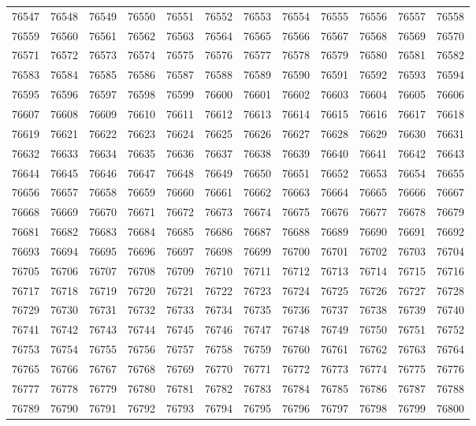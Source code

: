 \begin{center}
\begin{longtable}{llllllllllll}
76547 &76548 &76549 &76550 &76551 &76552 &76553 &76554 &76555 &76556 &76557 &76558 \\
76559 &76560 &76561 &76562 &76563 &76564 &76565 &76566 &76567 &76568 &76569 &76570 \\
76571 &76572 &76573 &76574 &76575 &76576 &76577 &76578 &76579 &76580 &76581 &76582 \\
76583 &76584 &76585 &76586 &76587 &76588 &76589 &76590 &76591 &76592 &76593 &76594 \\
76595 &76596 &76597 &76598 &76599 &76600 &76601 &76602 &76603 &76604 &76605 &76606 \\
76607 &76608 &76609 &76610 &76611 &76612 &76613 &76614 &76615 &76616 &76617 &76618 \\
76619 &76621 &76622 &76623 &76624 &76625 &76626 &76627 &76628 &76629 &76630 &76631 \\
76632 &76633 &76634 &76635 &76636 &76637 &76638 &76639 &76640 &76641 &76642 &76643 \\
76644 &76645 &76646 &76647 &76648 &76649 &76650 &76651 &76652 &76653 &76654 &76655 \\
76656 &76657 &76658 &76659 &76660 &76661 &76662 &76663 &76664 &76665 &76666 &76667 \\
76668 &76669 &76670 &76671 &76672 &76673 &76674 &76675 &76676 &76677 &76678 &76679 \\
76681 &76682 &76683 &76684 &76685 &76686 &76687 &76688 &76689 &76690 &76691 &76692 \\
76693 &76694 &76695 &76696 &76697 &76698 &76699 &76700 &76701 &76702 &76703 &76704 \\
76705 &76706 &76707 &76708 &76709 &76710 &76711 &76712 &76713 &76714 &76715 &76716 \\
76717 &76718 &76719 &76720 &76721 &76722 &76723 &76724 &76725 &76726 &76727 &76728 \\
76729 &76730 &76731 &76732 &76733 &76734 &76735 &76736 &76737 &76738 &76739 &76740 \\
76741 &76742 &76743 &76744 &76745 &76746 &76747 &76748 &76749 &76750 &76751 &76752 \\
76753 &76754 &76755 &76756 &76757 &76758 &76759 &76760 &76761 &76762 &76763 &76764 \\
76765 &76766 &76767 &76768 &76769 &76770 &76771 &76772 &76773 &76774 &76775 &76776 \\
76777 &76778 &76779 &76780 &76781 &76782 &76783 &76784 &76785 &76786 &76787 &76788 \\
76789 &76790 &76791 &76792 &76793 &76794 &76795 &76796 &76797 &76798 &76799 &76800 \\

\end{longtable}
\end{center}
